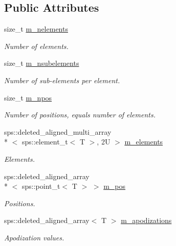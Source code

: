 \subsection*{Public Attributes}
\begin{DoxyCompactItemize}
\item 
size\+\_\+t \hyperlink{singletonfnm_1_1ApertureData_abdbdad71db1171b8094096d729baba0d}{m\+\_\+nelements}
\begin{DoxyCompactList}\small\item\em Number of elements. \end{DoxyCompactList}\item 
size\+\_\+t \hyperlink{singletonfnm_1_1ApertureData_a3536d0df01270d92f8ccc3623a2d06a0}{m\+\_\+nsubelements}
\begin{DoxyCompactList}\small\item\em Number of sub-\/elements per element. \end{DoxyCompactList}\item 
size\+\_\+t \hyperlink{singletonfnm_1_1ApertureData_ae07b6e86eb090f4c39fc425c78d91416}{m\+\_\+npos}
\begin{DoxyCompactList}\small\item\em Number of positions, equals number of elements. \end{DoxyCompactList}\item 
sps\+::deleted\+\_\+aligned\+\_\+multi\+\_\+array\\*
$<$ sps\+::element\+\_\+t$<$ T $>$, 2\+U $>$ \hyperlink{singletonfnm_1_1ApertureData_a53616cedfa7ae60a83e12ab990d2cd66}{m\+\_\+elements}
\begin{DoxyCompactList}\small\item\em Elements. \end{DoxyCompactList}\item 
sps\+::deleted\+\_\+aligned\+\_\+array\\*
$<$ sps\+::point\+\_\+t$<$ T $>$ $>$ \hyperlink{singletonfnm_1_1ApertureData_aa1b289835c0e222f6b8f70e2fafc6769}{m\+\_\+pos}
\begin{DoxyCompactList}\small\item\em Positions. \end{DoxyCompactList}\item 
sps\+::deleted\+\_\+aligned\+\_\+array$<$ T $>$ \hyperlink{singletonfnm_1_1ApertureData_af488bbf393fcd49e6698dcf3ce028041}{m\+\_\+apodizations}
\begin{DoxyCompactList}\small\item\em Apodization values. \end{DoxyCompactList}\item 

\end{DoxyCompactItemize}
